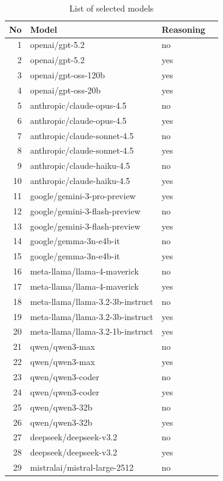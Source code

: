 \appendix

\label{app:llms}

\begin{table}[ht]
\centering
\caption{List of selected models}
\label{tab:models}
\begin{tabular}{rllc}
\hline
No & Model & Reasoning \\
\hline
1 & openai/gpt-5.2 & no \\
2 & openai/gpt-5.2 & yes \\
3 & openai/gpt-oss-120b & yes \\
4 & openai/gpt-oss-20b & yes \\
5 & anthropic/claude-opus-4.5 & no \\
6 & anthropic/claude-opus-4.5 & yes \\
7 & anthropic/claude-sonnet-4.5 & no \\
8 & anthropic/claude-sonnet-4.5 & yes \\
9 & anthropic/claude-haiku-4.5 & no \\
10 & anthropic/claude-haiku-4.5 & yes \\
11 & google/gemini-3-pro-preview & yes \\
12 & google/gemini-3-flash-preview & no \\
13 & google/gemini-3-flash-preview & yes \\
14 & google/gemma-3n-e4b-it & no \\
15 & google/gemma-3n-e4b-it & yes \\
16 & meta-llama/llama-4-maverick & no \\
17 & meta-llama/llama-4-maverick & yes \\
18 & meta-llama/llama-3.2-3b-instruct & no \\
19 & meta-llama/llama-3.2-3b-instruct & yes \\
20 & meta-llama/llama-3.2-1b-instruct & yes \\
21 & qwen/qwen3-max & no \\
22 & qwen/qwen3-max & yes \\
23 & qwen/qwen3-coder & no \\
24 & qwen/qwen3-coder & yes \\
25 & qwen/qwen3-32b & no \\
26 & qwen/qwen3-32b & yes \\
27 & deepseek/deepseek-v3.2 & no \\
28 & deepseek/deepseek-v3.2 & yes \\
29 & mistralai/mistral-large-2512 & no \\

\end{tabular}
\end{table}
